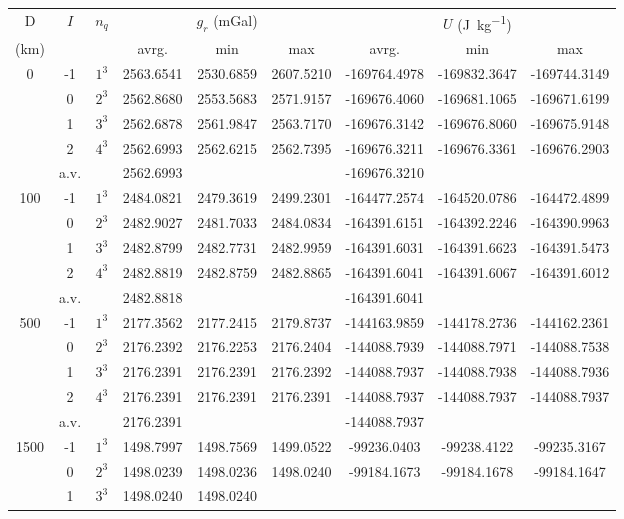 \documentclass{article}
\begin{document}
\begin{table}[htb]
\center
\begin{tabular}{|c|c|c|ccc|ccc|}
\hline
D  &
$I$ & $n_q$& & $g_r$ (mGal)  & && $U$ (\si{\joule\per\kg}) &\\
(\si{\km})&&& avrg.  & min  & max  &
avrg. & min & max    \\
\hline
0 & -1 & $1^3$ &
2563.6541 &
2530.6859 &
2607.5210 &
-169764.4978 &
-169832.3647 &
-169744.3149 \\
&0  & $2^3$ &
2562.8680 &
2553.5683 &
2571.9157 &
-169676.4060 &
-169681.1065 &
-169671.6199 \\
&1  & $3^3$ &
2562.6878 &
2561.9847 &
2563.7170 &
-169676.3142 &
-169676.8060 &
-169675.9148 \\
&2  & $4^3$  &
2562.6993 &
2562.6215 &
2562.7395 &
-169676.3211 &
-169676.3361 &
-169676.2903 \\
& a.v. && 2562.6993 &&& -169676.3210 & &\\
\hline\hline
100&-1 & $1^3$ &
2484.0821 &
2479.3619 &
2499.2301 &
-164477.2574 &
-164520.0786 &
-164472.4899 \\
&0 & $2^3$ &
2482.9027 &
2481.7033 &
2484.0834 &
-164391.6151 &
-164392.2246 &
-164390.9963 \\
& 1 & $3^3$ &  
2482.8799 &
2482.7731 &
2482.9959 &
-164391.6031 &
-164391.6623 &
-164391.5473 \\
& 2 & $4^3$ & 
2482.8819 &
2482.8759 &
2482.8865 &
-164391.6041 &
-164391.6067 &
-164391.6012\\
& a.v. & & 2482.8818 & & & -164391.6041 & &\\
\hline\hline
500&-1 & $1^3$&
2177.3562 &
2177.2415 &
2179.8737 &
-144163.9859 &
-144178.2736 &
-144162.2361 \\
& 0 & $2^3$ &
2176.2392 &
2176.2253 &
2176.2404 &
-144088.7939 &
-144088.7971 &
-144088.7538 \\
& 1 & $3^3$ & 
2176.2391 &
2176.2391 &
2176.2392 &
-144088.7937 &
-144088.7938 &
-144088.7936 \\
& 2 & $4^3$ & 
2176.2391 &
2176.2391 &
2176.2391 &
-144088.7937 &
-144088.7937 &
-144088.7937 \\
& a.v. && 2176.2391 &&& -144088.7937 & &\\
\hline\hline
1500&-1 & $1^3$ &
1498.7997 &
1498.7569 &
1499.0522 &
-99236.0403 &
-99238.4122 &
-99235.3167 \\
& 0 & $2^3$ &
1498.0239 &
1498.0236 &
1498.0240 &
-99184.1673 &
-99184.1678 &
-99184.1647 \\
& 1 & $3^3$ &
1498.0240 &
1498.0240 &

\end{tabular}
\end{table}
\end{document}
